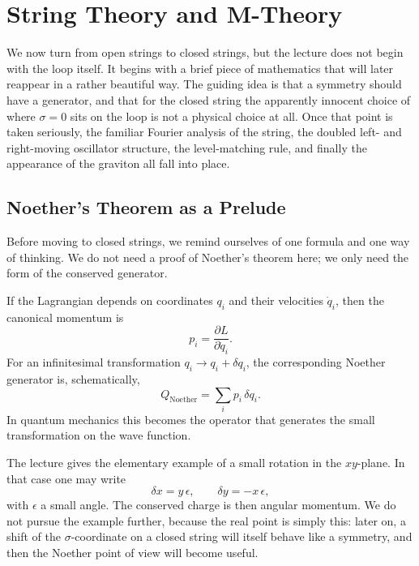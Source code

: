 \chapter{String Theory and M-Theory}

We now turn from open strings to closed strings, but the lecture does not begin with the loop itself. It begins with a brief piece of mathematics that will later reappear in a rather beautiful way. The guiding idea is that a symmetry should have a generator, and that for the closed string the apparently innocent choice of where \(\sigma=0\) sits on the loop is not a physical choice at all. Once that point is taken seriously, the familiar Fourier analysis of the string, the doubled left- and right-moving oscillator structure, the level-matching rule, and finally the appearance of the graviton all fall into place.

\section{Noether's Theorem as a Prelude}

Before moving to closed strings, we remind ourselves of one formula and one way of thinking. We do not need a proof of Noether's theorem here; we only need the form of the conserved generator.

If the Lagrangian depends on coordinates \(q_i\) and their velocities \(\dot q_i\), then the canonical momentum is
\begin{equation}
p_i=\frac{\partial L}{\partial \dot q_i}.
\end{equation}
For an infinitesimal transformation \(q_i\to q_i+\delta q_i\), the corresponding Noether generator is, schematically,
\begin{equation}
Q_{\mathrm{Noether}}=\sum_i p_i\,\delta q_i.
\end{equation}
In quantum mechanics this becomes the operator that generates the small transformation on the wave function.

The lecture gives the elementary example of a small rotation in the \(xy\)-plane. In that case one may write
\begin{equation}
\delta x = y\,\epsilon,
\qquad
\delta y = -x\,\epsilon,
\end{equation}
with \(\epsilon\) a small angle. The conserved charge is then angular momentum. We do not pursue the example further, because the real point is simply this: later on, a shift of the \(\sigma\)-coordinate on a closed string will itself behave like a symmetry, and then the Noether point of view will become useful.

